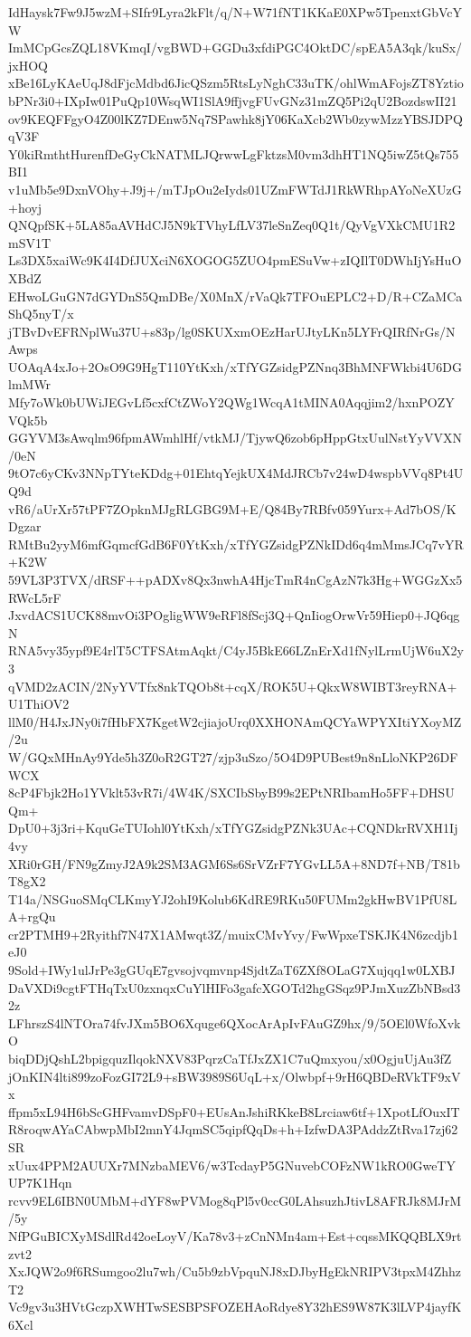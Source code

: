 IdHaysk7Fw9J5wzM+SIfr9Lyra2kFlt/q/N+W71fNT1KKaE0XPw5TpenxtGbVcYW
ImMCpGcsZQL18VKmqI/vgBWD+GGDu3xfdiPGC4OktDC/spEA5A3qk/kuSx/jxHOQ
xBe16LyKAeUqJ8dFjcMdbd6JicQSzm5RtsLyNghC33uTK/ohlWmAFojsZT8Yztio
bPNr3i0+IXpIw01PuQp10WsqWI1SlA9ffjvgFUvGNz31mZQ5Pi2qU2BozdswII21
ov9KEQFFgyO4Z00lKZ7DEnw5Nq7SPawhk8jY06KaXcb2Wb0zywMzzYBSJDPQqV3F
Y0kiRmthtHurenfDeGyCkNATMLJQrwwLgFktzsM0vm3dhHT1NQ5iwZ5tQs755BI1
v1uMb5e9DxnVOhy+J9j+/mTJpOu2eIyds01UZmFWTdJ1RkWRhpAYoNeXUzG+hoyj
QNQpfSK+5LA85aAVHdCJ5N9kTVhyLfLV37leSnZeq0Q1t/QyVgVXkCMU1R2mSV1T
Ls3DX5xaiWc9K4I4DfJUXciN6XOGOG5ZUO4pmESuVw+zIQIlT0DWhIjYsHuOXBdZ
EHwoLGuGN7dGYDnS5QmDBe/X0MnX/rVaQk7TFOuEPLC2+D/R+CZaMCaShQ5nyT/x
jTBvDvEFRNplWu37U+s83p/lg0SKUXxmOEzHarUJtyLKn5LYFrQIRfNrGs/NAwps
UOAqA4xJo+2OsO9G9HgT110YtKxh/xTfYGZsidgPZNnq3BhMNFWkbi4U6DGlmMWr
Mfy7oWk0bUWiJEGvLf5cxfCtZWoY2QWg1WcqA1tMINA0Aqqjim2/hxnPOZYVQk5b
GGYVM3sAwqlm96fpmAWmhlHf/vtkMJ/TjywQ6zob6pHppGtxUulNstYyVVXN/0eN
9tO7c6yCKv3NNpTYteKDdg+01EhtqYejkUX4MdJRCb7v24wD4wspbVVq8Pt4UQ9d
vR6/aUrXr57tPF7ZOpknMJgRLGBG9M+E/Q84By7RBfv059Yurx+Ad7bOS/KDgzar
RMtBu2yyM6mfGqmcfGdB6F0YtKxh/xTfYGZsidgPZNkIDd6q4mMmsJCq7vYR+K2W
59VL3P3TVX/dRSF++pADXv8Qx3nwhA4HjcTmR4nCgAzN7k3Hg+WGGzXx5RWcL5rF
JxvdACS1UCK88mvOi3POgligWW9eRFl8fScj3Q+QnIiogOrwVr59Hiep0+JQ6qgN
RNA5vy35ypf9E4rlT5CTFSAtmAqkt/C4yJ5BkE66LZnErXd1fNylLrmUjW6uX2y3
qVMD2zACIN/2NyYVTfx8nkTQOb8t+cqX/ROK5U+QkxW8WIBT3reyRNA+U1ThiOV2
llM0/H4JxJNy0i7fHbFX7KgetW2cjiajoUrq0XXHONAmQCYaWPYXItiYXoyMZ/2u
W/GQxMHnAy9Yde5h3Z0oR2GT27/zjp3uSzo/5O4D9PUBest9n8nLloNKP26DFWCX
8cP4Fbjk2Ho1YVklt53vR7i/4W4K/SXCIbSbyB99s2EPtNRIbamHo5FF+DHSUQm+
DpU0+3j3ri+KquGeTUIohl0YtKxh/xTfYGZsidgPZNk3UAc+CQNDkrRVXH1Ij4vy
XRi0rGH/FN9gZmyJ2A9k2SM3AGM6Ss6SrVZrF7YGvLL5A+8ND7f+NB/T81bT8gX2
T14a/NSGuoSMqCLKmyYJ2ohI9Kolub6KdRE9RKu50FUMm2gkHwBV1PfU8LA+rgQu
cr2PTMH9+2Ryithf7N47X1AMwqt3Z/muixCMvYvy/FwWpxeTSKJK4N6zcdjb1eJ0
9Sold+IWy1ulJrPe3gGUqE7gvsojvqmvnp4SjdtZaT6ZXf8OLaG7Xujqq1w0LXBJ
DaVXDi9cgtFTHqTxU0zxnqxCuYlHIFo3gafcXGOTd2hgGSqz9PJmXuzZbNBsd32z
LFhrszS4lNTOra74fvJXm5BO6Xquge6QXocArApIvFAuGZ9hx/9/5OEl0WfoXvkO
biqDDjQshL2bpigquzIlqokNXV83PqrzCaTfJxZX1C7uQmxyou/x0OgjuUjAu3fZ
jOnKIN4lti899zoFozGI72L9+sBW3989S6UqL+x/Olwbpf+9rH6QBDeRVkTF9xVx
ffpm5xL94H6bScGHFvamvDSpF0+EUsAnJshiRKkeB8Lrciaw6tf+1XpotLfOuxIT
R8roqwAYaCAbwpMbI2mnY4JqmSC5qipfQqDs+h+IzfwDA3PAddzZtRva17zj62SR
xUux4PPM2AUUXr7MNzbaMEV6/w3TcdayP5GNuvebCOFzNW1kRO0GweTYUP7K1Hqn
rcvv9EL6IBN0UMbM+dYF8wPVMog8qPl5v0ccG0LAhsuzhJtivL8AFRJk8MJrM/5y
NfPGuBICXyMSdlRd42oeLoyV/Ka78v3+zCnNMn4am+Est+cqssMKQQBLX9rtzvt2
XxJQW2o9f6RSumgoo2lu7wh/Cu5b9zbVpquNJ8xDJbyHgEkNRIPV3tpxM4ZhhzT2
Vc9gv3u3HVtGczpXWHTwSESBPSFOZEHAoRdye8Y32hES9W87K3lLVP4jayfK6Xcl
